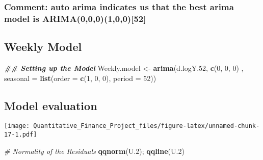 \documentclass[
]{article}
\newenvironment{Shaded}{\begin{snugshade}}{\end{snugshade}}
\newcommand{\AttributeTok}[1]{\textcolor[rgb]{0.13,0.29,0.53}{#1}}
\newcommand{\CommentTok}[1]{\textcolor[rgb]{0.56,0.35,0.01}{\textit{#1}}}
\newcommand{\DecValTok}[1]{\textcolor[rgb]{0.00,0.00,0.81}{#1}}
\newcommand{\DocumentationTok}[1]{\textcolor[rgb]{0.56,0.35,0.01}{\textbf{\textit{#1}}}}
\newcommand{\FloatTok}[1]{\textcolor[rgb]{0.00,0.00,0.81}{#1}}
\newcommand{\FunctionTok}[1]{\textcolor[rgb]{0.13,0.29,0.53}{\textbf{#1}}}
\newcommand{\NormalTok}[1]{#1}
\newcommand{\OtherTok}[1]{\textcolor[rgb]{0.56,0.35,0.01}{#1}}
\newcommand{\SpecialCharTok}[1]{\textcolor[rgb]{0.81,0.36,0.00}{\textbf{#1}}}
\begin{document}
\hypertarget{comment-auto-arima-indicates-us-that-the-best-arima-model-is-arima00010052}{%
\subsubsection{Comment: auto arima indicates us that the best arima
model is
ARIMA(0,0,0)(1,0,0){[}52{]}}\label{comment-auto-arima-indicates-us-that-the-best-arima-model-is-arima00010052}}

\hypertarget{weekly-model}{%
\subsection{Weekly Model}\label{weekly-model}}

\begin{Shaded}
\begin{Highlighting}[]
\DocumentationTok{\#\# Setting up the Model}
\NormalTok{Weekly.model }\OtherTok{\textless{}{-}} \FunctionTok{arima}\NormalTok{(d.logY}\FloatTok{.52}\NormalTok{, }\FunctionTok{c}\NormalTok{(}\DecValTok{0}\NormalTok{, }\DecValTok{0}\NormalTok{, }\DecValTok{0}\NormalTok{) , }\AttributeTok{seasonal =} \FunctionTok{list}\NormalTok{(}\AttributeTok{order =} \FunctionTok{c}\NormalTok{(}\DecValTok{1}\NormalTok{, }\DecValTok{0}\NormalTok{, }\DecValTok{0}\NormalTok{), }\AttributeTok{period =} \DecValTok{52}\NormalTok{))}
\end{Highlighting}
\end{Shaded}

\hypertarget{model-evaluation-1}{%
\subsection{Model evaluation}\label{model-evaluation-1}}

\begin{Shaded}
\end{Shaded}

\texttt{[image: Quantitative\_Finance\_Project\_files/figure-latex/unnamed-chunk-17-1.pdf]}

\begin{Shaded}
\begin{Highlighting}[]
\CommentTok{\# Normality of the Residuals}
\FunctionTok{qqnorm}\NormalTok{(U}\FloatTok{.2}\NormalTok{); }\FunctionTok{qqline}\NormalTok{(U}\FloatTok{.2}\NormalTok{)}
\end{Highlighting}
\end{Shaded}
\end{document}
